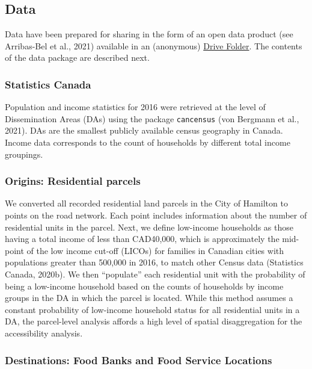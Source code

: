 \documentclass[]{elsarticle} %
\begin{document}
\hypertarget{data}{%
\subsection{Data}\label{data}}

Data have been prepared for sharing in the form of an open data product
(see Arribas-Bel et al., 2021) available in an (anonymous)
\href{https://drive.google.com/drive/folders/1-l8hO1pMIqaBqf57j_M_BMrXhXFvrV2c?usp=sharing}{Drive
Folder}. The contents of the data package are described next.

\hypertarget{statistics-canada}{%
\subsubsection{Statistics Canada}\label{statistics-canada}}

Population and income statistics for 2016 were retrieved at the level of
Dissemination Areas (DAs) using the package \texttt{cancensus} (von
Bergmann et al., 2021). DAs are the smallest publicly available census
geography in Canada. Income data corresponds to the count of households
by different total income groupings.

\hypertarget{origins-residential-parcels}{%
\subsubsection{Origins: Residential
parcels}\label{origins-residential-parcels}}

We converted all recorded residential land parcels in the City of
Hamilton to points on the road network. Each point includes information
about the number of residential units in the parcel. Next, we define
low-income households as those having a total income of less than
CAD40,000, which is approximately the mid-point of the low income
cut-off (LICOs) for families in Canadian cities with populations greater
than 500,000 in 2016, to match other Census data (Statistics Canada,
2020b). We then ``populate'' each residential unit with the probability
of being a low-income household based on the counts of households by
income groups in the DA in which the parcel is located. While this
method assumes a constant probability of low-income household status for
all residential units in a DA, the parcel-level analysis affords a high
level of spatial disaggregation for the accessibility analysis.

\hypertarget{destinations-food-banks-and-food-service-locations}{%
\subsubsection{Destinations: Food Banks and Food Service
Locations}\label{destinations-food-banks-and-food-service-locations}}
\end{document}
